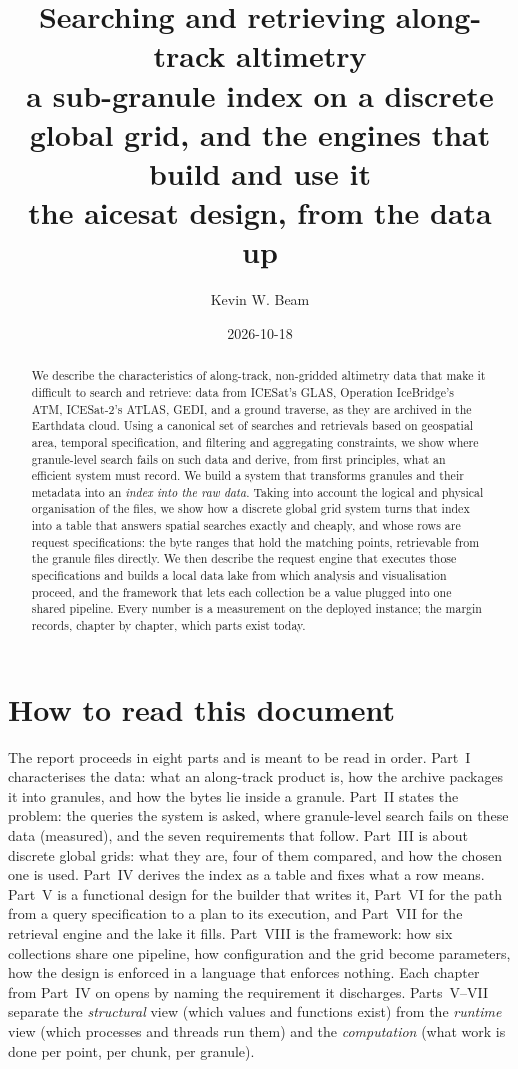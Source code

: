 \documentclass[10pt,a4paper]{article}
\title{\textbf{Searching and retrieving along-track altimetry}\\[4pt]
  \large a sub-granule index on a discrete global grid, and the engines that build and use it\\[2pt]
  \normalsize the aicesat design, from the data up}
\author{Kevin W. Beam}
\date{2026-10-18}
\begin{document}
\maketitle
\vspace{-2em}

\begin{abstract}
\noindent
We describe the characteristics of along-track, non-gridded altimetry data that make it difficult to search and
retrieve: data from ICESat's GLAS, Operation IceBridge's ATM, ICESat-2's ATLAS, GEDI, and a ground traverse, as
they are archived in the Earthdata cloud. Using a canonical set of searches and retrievals based on geospatial area,
temporal specification, and filtering and aggregating constraints, we show where granule-level search fails on such
data and derive, from first principles, what an efficient system must record. We build a system that transforms
granules and their metadata into an \emph{index into the raw data}. Taking into account the logical and physical
organisation of the files, we show how a discrete global grid system turns that index into a table that answers
spatial searches exactly and cheaply, and whose rows are request specifications: the byte ranges that hold the
matching points, retrievable from the granule files directly. We then describe the request engine that executes
those specifications and builds a local data lake from which analysis and visualisation proceed, and the framework
that lets each collection be a value plugged into one shared pipeline. Every number is a measurement on the deployed
instance; the margin records, chapter by chapter, which parts exist today.
\end{abstract}

\vspace{0.5em}

\section*{How to read this document}

The report proceeds in eight parts and is meant to be read in order. Part~I characterises the data: what an
along-track product is, how the archive packages it into granules, and how the bytes lie inside a granule.
Part~II states the problem: the queries the system is asked, where granule-level search fails on these data
(measured), and the seven requirements that follow. Part~III is about discrete global grids: what they are, four of
them compared, and how the chosen one is used. Part~IV derives the index as a table and fixes what a row means.
Part~V is a functional design for the builder that writes it, Part~VI for the path from a query specification to a
plan to its execution, and Part~VII for the retrieval engine and the lake it fills. Part~VIII is the framework: how
six collections share one pipeline, how configuration and the grid become parameters, how the design is enforced in
a language that enforces nothing. Each chapter from Part~IV on opens by naming the requirement it discharges.
Parts~V--VII separate the \emph{structural} view (which values and functions exist) from the \emph{runtime} view
(which processes and threads run them) and the \emph{computation} (what work is done per point, per chunk, per
granule).
\end{document}
